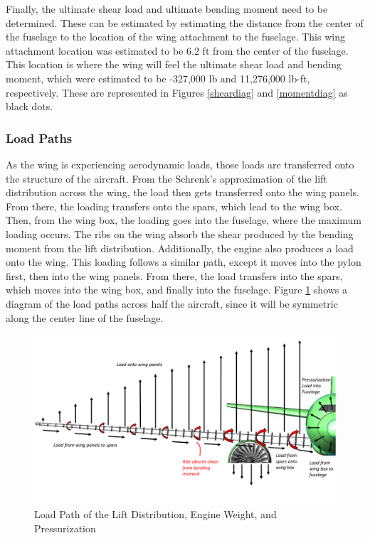 \clearpage
Finally, the ultimate shear load and ultimate bending moment need to be determined. These can be estimated by estimating the distance from the center of the fuselage to the location of the wing attachment to the fuselage. This wing attachment location was estimated to be 6.2 ft from the center of the fuselage. This location is where the wing will feel the ultimate shear load and bending moment, which were estimated to be -327,000 lb and 11,276,000 lb-ft, respectively. These are represented in Figures \ref{sheardiag} and \ref{momentdiag} as black dots. 

\subsubsection{Load Paths}
As the wing is experiencing aerodynamic loads, those loads are transferred onto the structure of the aircraft. From the Schrenk's approximation of the lift distribution across the wing, the load then gets transferred onto the wing panels. From there, the loading transfers onto the spars, which lead to the wing box. Then, from the wing box, the loading goes into the fuselage, where the maximum loading occurs. The ribs on the wing absorb the shear produced by the bending moment from the lift distribution. Additionally, the engine also produces a load onto the wing. This loading follows a similar path, except it moves into the pylon first, then into the wing panels. From there, the load transfers into the spars, which moves into the wing box, and finally into the fuselage. Figure \ref{loadpath} shows a diagram of the load paths across half the aircraft, since it will be symmetric along the center line of the fuselage. 

\begin{figure}[H]
    \centering
    \includegraphics[width=1.0\linewidth]{Photos/Load_Path.pdf}
    \caption{Load Path of the Lift Distribution, Engine Weight, and Pressurization}
    \label{loadpath}
\end{figure}

